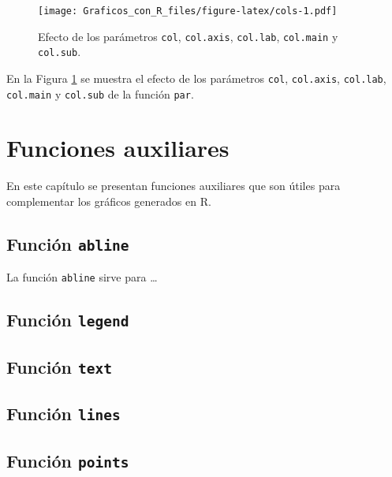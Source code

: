 \documentclass[10pt,]{krantz}
\let\proglang=\textsf
\begin{document}
\begin{figure}[htbp]
\centering
\texttt{[image: Graficos\_con\_R\_files/figure-latex/cols-1.pdf]}
\caption{\label{fig:cols}Efecto de los parámetros \texttt{col},
\texttt{col.axis}, \texttt{col.lab}, \texttt{col.main} y
\texttt{col.sub}.}
\end{figure}

En la Figura \ref{fig:cols} se muestra el efecto de los parámetros
\texttt{col}, \texttt{col.axis}, \texttt{col.lab}, \texttt{col.main} y
\texttt{col.sub} de la función \texttt{par}.

\chapter{Funciones auxiliares}\label{funciones-auxiliares}

En este capítulo se presentan funciones auxiliares que son útiles para
complementar los gráficos generados en \proglang{R}.

\section{\texorpdfstring{Función \texttt{abline}
}{Función abline }}\label{funcion-abline}

La función \texttt{abline} sirve para \ldots{}

\section{\texorpdfstring{Función \texttt{legend} 
}{Función legend  }}\label{funcion-legend}

\section{\texorpdfstring{Función \texttt{text} 
}{Función text  }}\label{funcion-text}

\section{\texorpdfstring{Función \texttt{lines} 
}{Función lines  }}\label{funcion-lines}

\section{\texorpdfstring{Función \texttt{points} 
}{Función points  }}\label{funcion-points}
\end{document}
